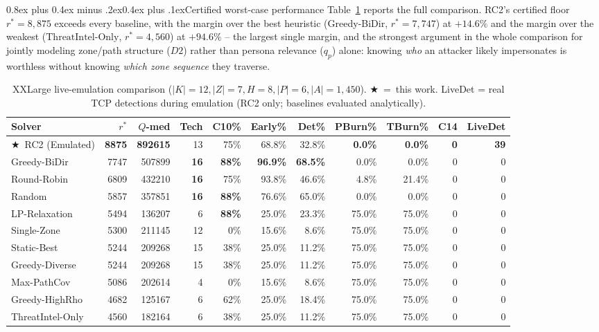 \documentclass[10pt,twocolumn]{article}
\makeatletter
\renewcommand{\subsection}{\@startsection{subsection}{2}{0pt}%
  {0.8ex plus 0.4ex minus .2ex}{0.4ex plus .1ex}{\normalfont\bfseries}}
\makeatother
\begin{document}
\subsection{Certified worst-case performance}
Table~\ref{tab:results} reports the full comparison. RC2's certified floor $r^*=8{,}875$ exceeds every baseline, with the margin over the best heuristic (Greedy-BiDir, $r^*{=}7{,}747$) at $+14.6\%$ and the margin over the weakest ($\mathrm{ThreatIntel\text{-}Only}$, $r^*{=}4{,}560$) at $+94.6\%$ -- the largest single margin, and the strongest argument in the whole comparison for jointly modeling zone/path structure ($D2$) rather than persona relevance ($q_p$) alone: knowing \emph{who} an attacker likely impersonates is worthless without knowing \emph{which zone sequence} they traverse.

\begin{table}[t]
\centering
\caption{XXLarge live-emulation comparison ($|K|{=}12,|Z|{=}7,H{=}8,|P|{=}6,|A|{=}1{,}450$). $\bigstar$~=~this work. LiveDet = real TCP detections during emulation (RC2 only; baselines evaluated analytically).}
\label{tab:results}
\small
\begin{tabular}{lrrrrrrrrrr}
\toprule
Solver & $r^*$ & $Q$-med & Tech & C10\% & Early\% & Det\% & PBurn\% & TBurn\% & C14 & LiveDet \\
\midrule
$\bigstar$~RC2 (Emulated) & \textbf{8875} & \textbf{892615} & 13 & 75\% & 68.8\% & 32.8\% & \textbf{0.0\%} & \textbf{0.0\%} & \textbf{0} & \textbf{39} \\
Greedy-BiDir      & 7747 & 507899 & \textbf{16} & \textbf{88\%} & \textbf{96.9\%} & \textbf{68.5\%} & 0.0\% & 0.0\% & 0 & 0 \\
Round-Robin       & 6809 & 432210 & \textbf{16} & 75\% & 93.8\% & 46.6\% & 4.8\% & 21.4\% & 0 & 0 \\
Random            & 5857 & 357851 & \textbf{16} & \textbf{88\%} & 76.6\% & 65.0\% & 0.0\% & 0.0\% & 0 & 0 \\
LP-Relaxation     & 5494 & 136207 & 6  & \textbf{88\%} & 25.0\% & 23.3\% & 75.0\% & 75.0\% & 0 & 0 \\
Single-Zone       & 5300 & 211145 & 12 & 0\%  & 15.6\% & 8.6\%  & 75.0\% & 75.0\% & 0 & 0 \\
Static-Best       & 5244 & 209268 & 15 & 38\% & 25.0\% & 11.2\% & 75.0\% & 75.0\% & 0 & 0 \\
Greedy-Diverse    & 5244 & 209268 & 15 & 38\% & 25.0\% & 11.2\% & 75.0\% & 75.0\% & 0 & 0 \\
Max-PathCov       & 5086 & 202614 & 4  & 0\%  & 15.6\% & 8.6\%  & 75.0\% & 75.0\% & 0 & 0 \\
Greedy-HighRho    & 4682 & 125167 & 6  & 62\% & 25.0\% & 18.4\% & 75.0\% & 75.0\% & 0 & 0 \\
ThreatIntel-Only  & 4560 & 182164 & 6  & 38\% & 25.0\% & 11.2\% & 75.0\% & 75.0\% & 0 & 0 \\
\bottomrule
\end{tabular}
\end{table}
\end{document}
